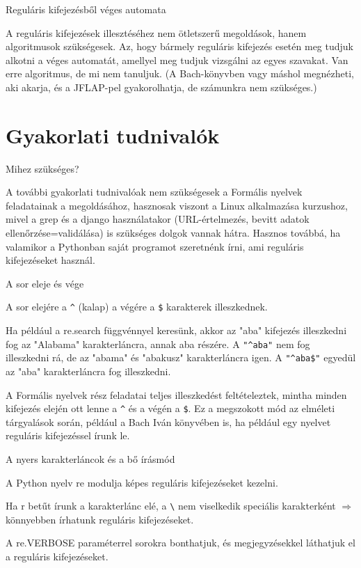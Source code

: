 \documentclass[
    ignorenonframetext
    ]{beamer}
\begin{document}
\begin{frame}
    {Reguláris kifejezésből véges automata}

    A reguláris kifejezések illesztéséhez nem ötletszerű megoldások, hanem
    algoritmusok szükségesek. Az, hogy bármely reguláris kifejezés esetén meg
    tudjuk alkotni a véges automatát, amellyel meg tudjuk vizsgálni az egyes
    szavakat. \alert{Van erre algoritmus}, de mi nem tanuljuk. (A Bach-könyvben
    vagy máshol megnézheti, aki akarja, és a JFLAP-pel gyakorolhatja, de
    számunkra nem szükséges.)
\end{frame}


\section{Gyakorlati tudnivalók}

\begin{frame}
    {Mihez szükséges?}

    A további gyakorlati tudnivalóak nem szükségesek a Formális nyelvek
    feladatainak a megoldásához, hasznosak viszont a Linux alkalmazása
    kurzushoz, mivel a grep és a django használatakor (URL-értelmezés,
    bevitt adatok ellenőrzése=validálása) is szükséges dolgok vannak
    hátra. Hasznos továbbá, ha valamikor a Pythonban saját programot
    szeretnénk írni, ami reguláris kifejezéseket használ.
\end{frame}

\begin{frame}[fragile]
    {A sor eleje és vége}

    A sor elejére a \verb"^" (kalap) a végére a \verb"$" karakterek
    illeszkednek.

    \vfill
    Ha például a re.search függvénnyel keresünk, akkor az "aba"
    kifejezés illeszkedni fog az "Alabama" karakterláncra, annak aba
    részére. A \verb'"^aba"' nem fog illeszkedni rá, de az "abama" és
    "abakusz" karakterláncra igen. A \verb'"^aba$"' egyedül az "aba"
    karakterláncra fog illeszkedni.

    \vfill
    A Formális nyelvek rész feladatai teljes illeszkedést feltételeztek,
    mintha minden kifejezés elején ott lenne a \verb"^" és a végén a
    \verb"$". Ez a megszokott mód az elméleti tárgyalások során, például
    a Bach Iván könyvében is, ha például egy nyelvet reguláris
    kifejezéssel írunk le.
\end{frame}

\begin{frame}[fragile]
    {A nyers karakterláncok és a bő írásmód}


    A Python nyelv \alert{re} modulja képes reguláris kifejezéseket kezelni.

    \vfill
    Ha \alert{r} betűt írunk a karakterlánc elé, a \verb|\| nem
    viselkedik speciális karakterként $\Rightarrow$ könnyebben írhatunk
    reguláris kifejezéseket.

    \vfill
    A re.VERBOSE paraméterrel sorokra bonthatjuk, és megjegyzésekkel
    láthatjuk el a reguláris kifejezéseket.
\end{frame}
\end{document}
